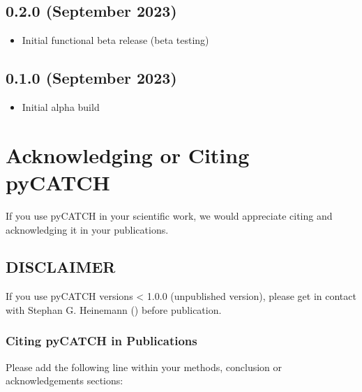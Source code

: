\documentclass[letterpaper,10pt,english]{sphinxmanual}
\begin{document}
\section{0.2.0 (September 2023)}
\label{\detokenize{changelog:september-2023}}\begin{itemize}
\item {} 
\sphinxAtStartPar
Initial functional beta release (beta \sphinxhyphen{} testing)

\end{itemize}


\section{0.1.0 (September 2023)}
\label{\detokenize{changelog:id1}}\begin{itemize}
\item {} 
\sphinxAtStartPar
Initial alpha build

\end{itemize}

\sphinxstepscope


\chapter{Acknowledging or Citing pyCATCH}
\label{\detokenize{acknowledging:acknowledging-or-citing-pycatch}}\label{\detokenize{acknowledging::doc}}
\sphinxAtStartPar
If you use pyCATCH in your scientific work, we would appreciate citing and acknowledging it in your publications.


\section{DISCLAIMER}
\label{\detokenize{acknowledging:disclaimer}}
\sphinxAtStartPar
If you use pyCATCH versions \textless{} 1.0.0 (unpublished version), please get in contact with Stephan G. Heinemann () before publication.


\subsection{Citing pyCATCH in Publications}
\label{\detokenize{acknowledging:citing-pycatch-in-publications}}
\sphinxAtStartPar
Please add the following line within your methods, conclusion or acknowledgements sections:
\begin{quote}

\sphinxAtStartPar
{}
\end{quote}
\end{document}
